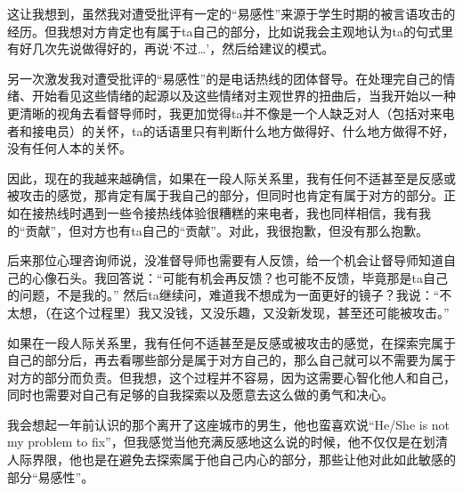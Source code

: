 
这让我想到，虽然我对遭受批评有一定的“易感性”\pozhehao{}来源于学生时期的被言语攻击的经历。但我想对方肯定也有属于ta自己的部分，比如说我会主观地认为ta的句式里有好几次先说做得好的，再说‘不过…’，然后给建议的模式。


另一次激发我对遭受批评的“易感性”的是电话热线的团体督导。在处理完自己的情绪、开始看见这些情绪的起源以及这些情绪对主观世界的扭曲后，当我开始以一种更清晰的视角去看督导师时，我更加觉得ta并不像是一个人\pozhehao{}缺乏对人（包括对来电者和接电员）的关怀，ta的话语里只有判断什么地方做得好、什么地方做得不好，没有任何人本的关怀。

因此，现在的我越来越确信，如果在一段人际关系里，我有任何不适甚至是反感或被攻击的感觉，那肯定有属于我自己的部分，但同时也肯定有属于对方的部分。正如在接热线时遇到一些令接热线体验很糟糕的来电者，我也同样相信，我有我的“贡献”，但对方也有ta自己的“贡献”。对此，我很抱歉，但没有那么抱歉。

后来那位心理咨询师说，没准督导师也需要有人反馈，给一个机会让督导师知道自己的心像石头。我回答说：“可能有机会再反馈？也可能不反馈，毕竟那是ta自己的问题，不是我的。” 然后ta继续问，难道我不想成为一面更好的镜子？我说：“不太想，（在这个过程里）我又没钱，又没乐趣，又没新发现，甚至还可能被攻击。”

如果在一段人际关系里，我有任何不适甚至是反感或被攻击的感觉，在探索完属于自己的部分后，再去看哪些部分是属于对方自己的，那么自己就可以不需要为属于对方的部分而负责。但我想，这个过程并不容易，因为这需要心智化他人和自己，同时也需要对自己有足够的自我探索以及愿意去这么做的勇气和决心。

我会想起一年前认识的那个离开了这座城市的男生，他也蛮喜欢说“He/She is not my problem to fix”，但我感觉当他充满反感地这么说的时候，他不仅仅是在划清人际界限，他也是在避免去探索属于他自己内心的部分，那些让他对此如此敏感的部分\pozhehao{}“易感性”。

